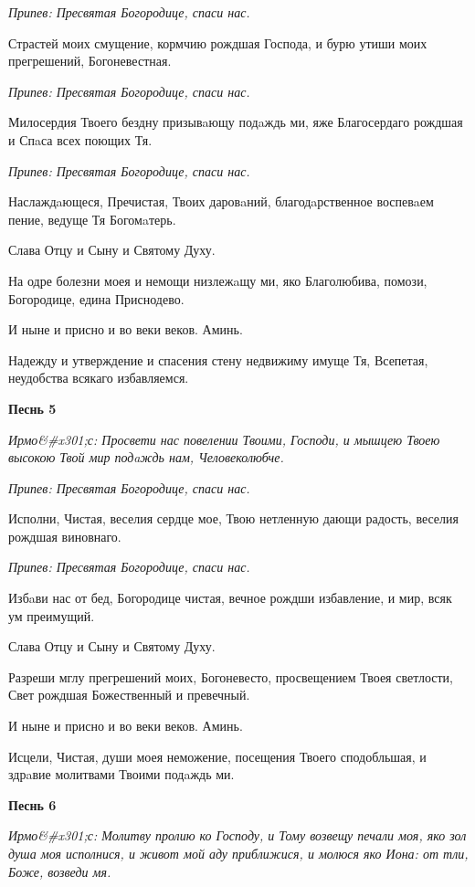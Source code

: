 \itshape Припев:\normalfont{} Пресвятая Богородице, спаси нас.


Страстей моих смущение, кормчию рождшая Господа, и бурю утиши моих прегрешений, Богоневестная.


\itshape Припев:\normalfont{} Пресвятая Богородице, спаси нас.


Милосердия Твоего бездну призывaющу подaждь ми, яже Благосердаго рождшая и Спaса всех поющих Тя.


\itshape Припев:\normalfont{} Пресвятая Богородице, спаси нас.


Наслаждaющеся, Пречистая, Твоих даровaний, благодaрственное воспевaем пение, ведуще Тя Богомaтерь.


Слава Отцу и Сыну и Святому Духу.


На одре болезни моея и немощи низлежaщу ми, яко Благолюбива, помози, Богородице, едина Приснодево.


И ныне и присно и во веки веков. Аминь.


Надежду и утверждение и спасения стену недвижиму имуще Тя, Всепетая, неудобства всякаго избавляемся.




\bfseries Песнь 5\normalfont{}


\itshape Ирмо&#x301;с:\normalfont{} Просвети нас повелении Твоими, Господи, и мышцею Твоею высокою Твой мир подaждь нам, Человеколюбче.


\itshape Припев:\normalfont{} Пресвятая Богородице, спаси нас.


Исполни, Чистая, веселия сердце мое, Твою нетленную дающи радость, веселия рождшая виновнаго.


\itshape Припев:\normalfont{} Пресвятая Богородице, спаси нас.


Избaви нас от бед, Богородице чистая, вечное рождши избавление, и мир, всяк ум преимущий.


Слава Отцу и Сыну и Святому Духу.


Разреши мглу прегрешений моих, Богоневесто, просвещением Твоея светлости, Свет рождшая Божественный и превечный.


И ныне и присно и во веки веков. Аминь.


Исцели, Чистая, души моея неможение, посещения Твоего сподобльшая, и здрaвие молитвами Твоими подaждь ми.




\bfseries Песнь 6\normalfont{}


\itshape Ирмо&#x301;с:\normalfont{} Молитву пролию ко Господу, и Тому возвещу печали моя, яко зол душа моя исполнися, и живот мой аду приближися, и молюся яко Иона: от тли, Боже, возведи мя.


